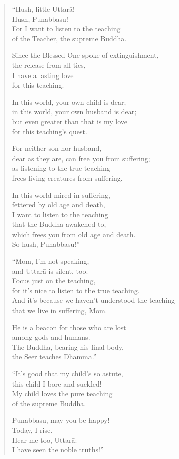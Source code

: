 \documentclass[12pt,openany]{book}%
\begin{document}
\begin{verse}%
“Hush, little \textsanskrit{Uttarā}! \\
Hush, Punabbasu! \\
For I want to listen to the teaching \\
of the Teacher, the supreme Buddha. 

Since the Blessed One spoke of extinguishment, \\
the release from all ties, \\
I have a lasting love \\
for this teaching. 

In this world, your own child is dear; \\
in this world, your own husband is dear; \\
but even greater than that is my love \\
for this teaching’s quest. 

For neither son nor husband, \\
dear as they are, can free you from suffering; \\
as listening to the true teaching \\
frees living creatures from suffering. 

In this world mired in suffering, \\
fettered by old age and death, \\
I want to listen to the teaching \\
that the Buddha awakened to, \\
which frees you from old age and death. \\
So hush, Punabbasu!” 

“Mom, I’m not speaking, \\
and \textsanskrit{Uttarā} is silent, too. \\
Focus just on the teaching, \\
for it’s nice to listen to the true teaching. \\
And it’s because we haven’t understood the teaching \\
that we live in suffering, Mom. 

He is a beacon for those who are lost \\
among gods and humans. \\
The Buddha, bearing his final body, \\
the Seer teaches Dhamma.” 

“It’s good that my child’s so astute, \\
this child I bore and suckled! \\
My child loves the pure teaching \\
of the supreme Buddha. 

Punabbasu, may you be happy! \\
Today, I rise. \\
Hear me too, \textsanskrit{Uttarā}: \\
I have seen the noble truths!” 

%
\end{verse}
\end{document}
